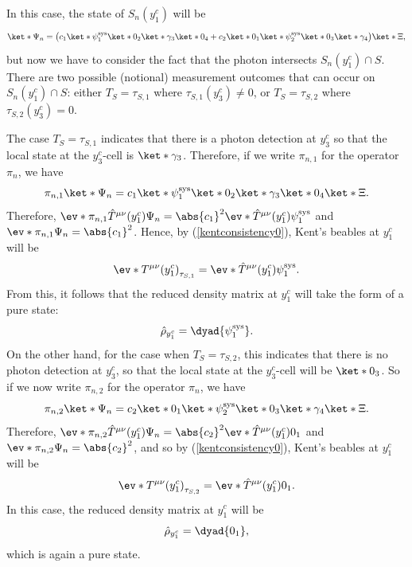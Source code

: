 \documentclass[12pt]{report}
\begin{document}
In this case, the state of $S_n(y^c_1)$ will be
 \begin{equation*}
 \ket*{\Psi_n}=\big(c_1\ket*{\psi_1^\text{sys}}\ket*{0_2}\ket*{\gamma_3}\ket*{0_4}+c_2\ket*{0_1}\ket*{\psi_2^\text{sys}}\ket*{0_3}\ket*{\gamma_4}\big)\ket*{\Xi},
 \end{equation*}
 but now we have to consider the fact that the photon intersects $S_n(y^c_1)\cap S$. There are two possible (notional) measurement outcomes that can occur on $S_n(y^c_1)\cap S$: either $T_S=\tau_{S,1}$ where $\tau_{S,1}(y^c_3)\neq 0$, or $T_S=\tau_{S,2}$ where $\tau_{S,2}(y^c_3)=0.$ 
 
 The case  $T_S=\tau_{S,1}$ indicates that there is a photon detection at $y^c_3$ so that the local state at the $y^c_3$-cell is $\ket*{\gamma_3}$. Therefore, if we write $\pi_{n,1}$ for the operator $\pi_n$, we have 
 $$\pi_{n,1}\ket*{\Psi_n}=c_1\ket*{\psi_1^\text{sys}}\ket*{0_2}\ket*{\gamma_3}\ket*{0_4}\ket*{\Xi}.$$
 Therefore, 
 $\ev*{\pi_{n,1}\hat{T}^{\mu\nu}(y^c_1)}{\Psi_n}=\abs{c_1}^2\ev*{\hat{T}^{\mu\nu}(y^c_1)}{\psi_1^\text{sys}}$ and  $\ev*{\pi_{n,1}}{\Psi_n}=\abs{c_1}^2$. Hence, by (\ref{kentconsistency0}), Kent's beables at $y^c_1$ will be 
 $$\ev*{T^{\mu\nu}(y^c_1)}_{\tau_{S,1}}=\ev*{\hat{T}^{\mu\nu}(y^c_1)}{\psi_1^\text{sys}}.$$ 
 From this, it follows that the reduced density matrix at $y^c_1$ will take the form of a pure state:
 \begin{equation}\label{purerho}
\hat{\rho}_{y^c_1}= \dyad{\psi_1^\text{sys}}.
\end{equation} 
 On the other hand, for the case when  $T_S=\tau_{S,2}$, this indicates that there is no photon detection at $y^c_3$, so that the local state at the $y^c_3$-cell will be $\ket*{0_3}$. So if we now  write $\pi_{n,2}$ for the operator $\pi_n$, we have 
 $$\pi_{n,2}\ket*{\Psi_n}=c_2\ket*{0_1}\ket*{\psi_2^\text{sys}}\ket*{0_3}\ket*{\gamma_4}\ket*{\Xi}.$$
 Therefore, 
 $\ev*{\pi_{n,2}\hat{T}^{\mu\nu}(y^c_1)}{\Psi_n}=\abs{c_2}^2\ev*{\hat{T}^{\mu\nu}(y^c_1)}{0_1}$ and  $\ev*{\pi_{n,2}}{\Psi_n}=\abs{c_2}^2$,  
  and so by (\ref{kentconsistency0}), Kent's beables at $y^c_1$ will be 
 $$\ev*{T^{\mu\nu}(y^c_1)}_{\tau_{S,2}}=\ev*{\hat{T}^{\mu\nu}(y^c_1)}{0_1}.$$
 In this case, the reduced density matrix at $y^c_1$  will be
  \begin{equation}
\hat{\rho}_{y^c_1}= \dyad{0_1},
\end{equation} 
which is again a pure state.
\end{document}
